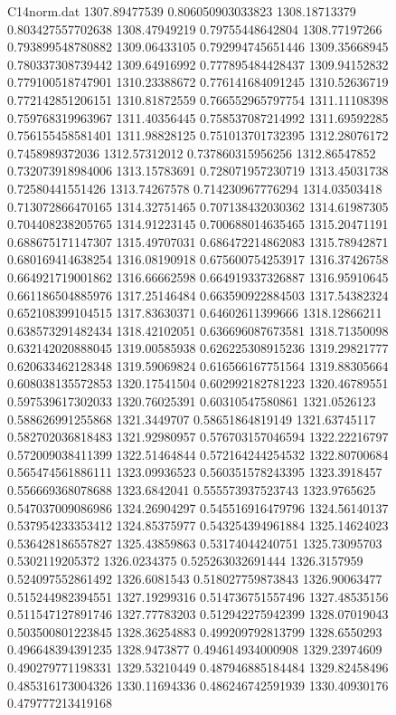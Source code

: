 \begin{filecontents}{C14norm.dat}
1307.89477539			0.806050903033823
1308.18713379			0.803427557702638
1308.47949219			0.79755448642804
1308.77197266			0.793899548780882
1309.06433105			0.792994745651446
1309.35668945			0.780337308739442
1309.64916992			0.777895484428437
1309.94152832			0.779100518747901
1310.23388672			0.776141684091245
1310.52636719			0.772142851206151
1310.81872559			0.766552965797754
1311.11108398			0.759768319963967
1311.40356445			0.758537087214992
1311.69592285			0.756155458581401
1311.98828125			0.751013701732395
1312.28076172			0.7458989372036
1312.57312012			0.737860315956256
1312.86547852			0.732073918984006
1313.15783691			0.728071957230719
1313.45031738			0.72580441551426
1313.74267578			0.714230967776294
1314.03503418			0.713072866470165
1314.32751465			0.707138432030362
1314.61987305			0.704408238205765
1314.91223145			0.700688014635465
1315.20471191			0.688675171147307
1315.49707031			0.686472214862083
1315.78942871			0.680169414638254
1316.08190918			0.675600754253917
1316.37426758			0.664921719001862
1316.66662598			0.664919337326887
1316.95910645			0.661186504885976
1317.25146484			0.663590922884503
1317.54382324			0.652108399104515
1317.83630371			0.64602611399666
1318.12866211			0.638573291482434
1318.42102051			0.636696087673581
1318.71350098			0.632142020888045
1319.00585938			0.626225308915236
1319.29821777			0.620633462128348
1319.59069824			0.616566167751564
1319.88305664			0.608038135572853
1320.17541504			0.602992182781223
1320.46789551			0.597539617302033
1320.76025391			0.60310547580861
1321.0526123			0.588626991255868
1321.3449707			0.58651864819149
1321.63745117			0.582702036818483
1321.92980957			0.576703157046594
1322.22216797			0.572009038411399
1322.51464844			0.572164244254532
1322.80700684			0.565474561886111
1323.09936523			0.560351578243395
1323.3918457			0.556669368078688
1323.6842041			0.555573937523743
1323.9765625			0.547037009086986
1324.26904297			0.545516916479796
1324.56140137			0.537954233353412
1324.85375977			0.543254394961884
1325.14624023			0.536428186557827
1325.43859863			0.53174044240751
1325.73095703			0.5302119205372
1326.0234375			0.525263032691444
1326.3157959			0.524097552861492
1326.6081543			0.518027759873843
1326.90063477			0.515244982394551
1327.19299316			0.514736751557496
1327.48535156			0.511547127891746
1327.77783203			0.512942275942399
1328.07019043			0.503500801223845
1328.36254883			0.499209792813799
1328.6550293			0.496648394391235
1328.9473877			0.494614934000908
1329.23974609			0.490279771198331
1329.53210449			0.487946885184484
1329.82458496			0.485316173004326
1330.11694336			0.486246742591939
1330.40930176			0.479777213419168

\end{filecontents}
